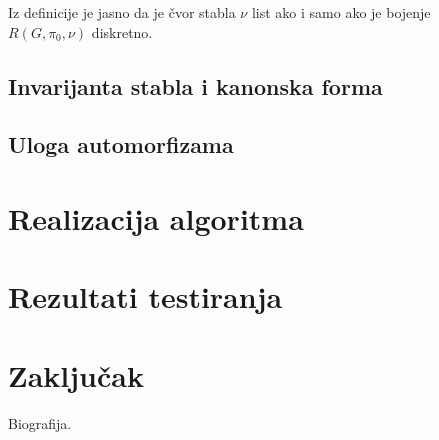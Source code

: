 \documentclass[12pt,oneside]{memoir}
\theoremstyle{definition} \newtheorem*{definition}{Definicija}
\begin{document}
 Iz definicije je jasno da je čvor stabla $\nu$ list ako i samo ako je bojenje $R(G, \pi_0, \nu)$ diskretno.

 \section{Invarijanta stabla i kanonska forma}

 \section{Uloga automorfizama}

\chapter{Realizacija algoritma}

\chapter{Rezultati testiranja}

\chapter{Zaključak}

\literatura

\backmatter

\begin{biografija}
	Biografija.
\end{biografija}
\end{document}
